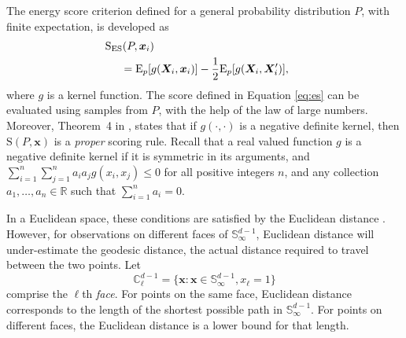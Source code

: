 The energy score criterion defined for a general probability distribution $P$, with finite expectation, is developed
    as
    \begin{equation}
    \label{eq:es}
    \begin{aligned}
    &\hspace{-0.5cm}\text{S}_{\text{ES}}\left(P, \bm{x}_i\right) \\
    &=\text{E}_p \left[g\left(\bm{X}_i, \bm{x}_i\right)\right] -
                                    \frac{1}{2}\text{E}_p \left[g\left(\bm{X}_i,\bm{X}_i^{\prime}\right)\right],
    \end{aligned}
    \end{equation}
where $g$ is a kernel function. The score defined in Equation \eqref{eq:es} can be evaluated
  using samples from $P$, with the help of the law of large numbers.
  Moreover, Theorem~4 in \cite{gneiting2007}, states that if $g(\cdot,\cdot)$ is a negative 
  definite kernel, then $\text{S}(P,\bm{x})$ is a \emph{proper} scoring rule.  Recall that a 
  real valued function $g$ is a negative definite kernel if it is symmetric in its arguments, 
  and $\sum_{i=1}^n\sum_{j=1}^na_ia_jg(x_i,x_j)\leq 0$ for all positive integers $n$, and any 
  collection $a_1,\ldots,a_n\in{\mathbb R}$ such that  $\sum_{i = 1}^na_i = 0$.  

In a Euclidean space, these conditions are satisfied by the Euclidean distance \citep{berg1984}. 
    However, for observations on different faces of ${\mathbb S}_{\infty}^{d-1}$, Euclidean 
    distance will under-estimate the geodesic distance, the actual distance required to travel 
    between the two points.  Let
\begin{equation*}
    {\mathbb C}_{\ell}^{d-1} = \lbrace \bm{x} : \bm{x} \in {\mathbb S}_{\infty}^{d-1}, x_{\ell} = 1\rbrace
\end{equation*}
comprise the $\ell$th \emph{face}.  For points on the same face, Euclidean distance 
  corresponds to the length of the shortest possible path in ${\mathbb S}_{\infty}^{d-1}$.  
  For points on different faces, the Euclidean distance is a lower bound for that length.

